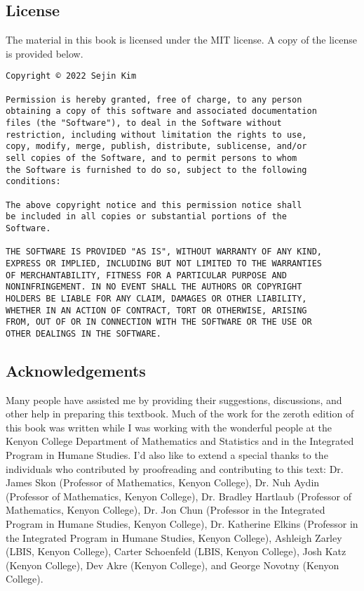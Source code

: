 \subsection*{License}
The material in this book is licensed under the MIT license. A copy of the license is provided below.\par

\begin{verbatim}
Copyright © 2022 Sejin Kim

Permission is hereby granted, free of charge, to any person
obtaining a copy of this software and associated documentation
files (the "Software"), to deal in the Software without
restriction, including without limitation the rights to use,
copy, modify, merge, publish, distribute, sublicense, and/or
sell copies of the Software, and to permit persons to whom
the Software is furnished to do so, subject to the following
conditions:

The above copyright notice and this permission notice shall
be included in all copies or substantial portions of the
Software.

THE SOFTWARE IS PROVIDED "AS IS", WITHOUT WARRANTY OF ANY KIND,
EXPRESS OR IMPLIED, INCLUDING BUT NOT LIMITED TO THE WARRANTIES
OF MERCHANTABILITY, FITNESS FOR A PARTICULAR PURPOSE AND
NONINFRINGEMENT. IN NO EVENT SHALL THE AUTHORS OR COPYRIGHT
HOLDERS BE LIABLE FOR ANY CLAIM, DAMAGES OR OTHER LIABILITY,
WHETHER IN AN ACTION OF CONTRACT, TORT OR OTHERWISE, ARISING
FROM, OUT OF OR IN CONNECTION WITH THE SOFTWARE OR THE USE OR
OTHER DEALINGS IN THE SOFTWARE.
\end{verbatim}
\subsection*{Acknowledgements}
Many people have assisted me by providing their suggestions, discussions, and other help in preparing this textbook. Much of the work for the zeroth edition of this book was written while I was working with the wonderful people at the Kenyon College Department of Mathematics and Statistics and in the Integrated Program in Humane Studies. I'd also like to extend a special thanks to the individuals who contributed by proofreading and contributing to this text: Dr. James Skon (Professor of Mathematics, Kenyon College), Dr. Nuh Aydin (Professor of Mathematics, Kenyon College), Dr. Bradley Hartlaub (Professor of Mathematics, Kenyon College), Dr. Jon Chun (Professor in the Integrated Program in Humane Studies, Kenyon College), Dr. Katherine Elkins (Professor in the Integrated Program in Humane Studies, Kenyon College), Ashleigh Zarley (LBIS, Kenyon College), Carter Schoenfeld (LBIS, Kenyon College), Josh Katz (Kenyon College), Dev Akre (Kenyon College), and George Novotny (Kenyon College).